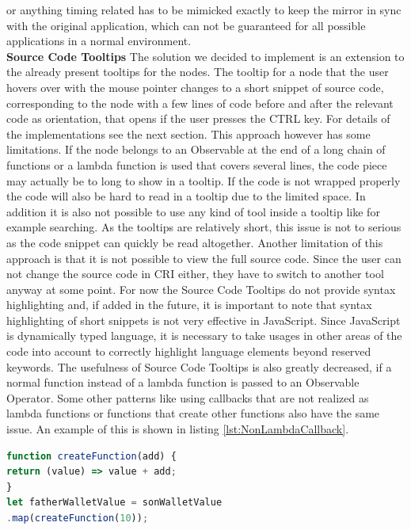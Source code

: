 or anything timing related has to be mimicked exactly to keep the mirror in sync with the original application, which can not be guaranteed for all possible applications in a normal environment. \\
\textbf{Source Code Tooltips}%
The solution we decided to implement is an extension to the already present tooltips for the nodes. The tooltip for a node that the user hovers over with the mouse pointer changes to a short snippet of source code, corresponding to the node with a few lines of code before and after the relevant code as orientation, that opens if the user presses the CTRL key. For details of the implementations see the next section. This approach however has some limitations. If the node belongs to an Observable at the end of a long chain of functions or a lambda function is used that covers several lines, the code piece may actually be to long to show in a tooltip. If the code is not wrapped properly the code will also be hard to read in a tooltip due to the limited space. In addition it is also not possible to use any kind of tool inside a tooltip like for example searching. As the tooltips are relatively short, this issue is not to serious as the code snippet can quickly be read altogether. Another limitation of this approach is that it is not possible to view the full source code. Since the user can not change the source code in CRI either, they have to switch to another tool anyway at some point. For now the Source Code Tooltips do not provide syntax highlighting and, if added in the future, it is important to note that syntax highlighting of short snippets is not very effective in JavaScript. Since JavaScript is dynamically typed language, it is necessary to take usages in other areas of the code into account to correctly highlight language elements beyond reserved keywords. The usefulness of Source Code Tooltips is also greatly decreased, if a normal function instead of a lambda function is passed to an Observable Operator. Some other patterns like using callbacks that are not realized as lambda functions or functions that create other functions also have the same issue. An example of this is shown in listing \ref{lst:NonLambdaCallback}.

\begin{lstlisting}[language=JavaScript, caption={Example of using a creation function in RxJS.},label={lst:NonLambdaCallback}]
function createFunction(add) {
return (value) => value + add;
}
let fatherWalletValue = sonWalletValue
.map(createFunction(10));
\end{lstlisting}


